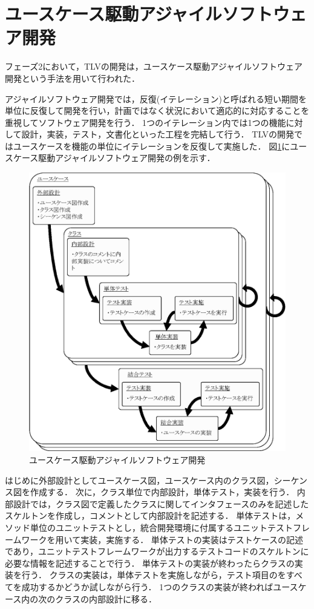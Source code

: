 \section{ユースケース駆動アジャイルソフトウェア開発}
\label{usecaseAgile}

フェーズ2において，TLVの開発は，ユースケース駆動アジャイルソフトウェア開発という手法を用いて行われた．

アジャイルソフトウェア開発では，反復(イテレーション)と呼ばれる短い期間を単位に反復して開発を行い，計画ではなく状況において適応的に対応することを重視してソフトウェア開発を行う．
1つのイテレーション内では1つの機能に対して設計，実装，テスト，文書化といった工程を完結して行う．
TLVの開発ではユースケースを機能の単位にイテレーションを反復して実施した．
図\ref{fig:agile}にユースケース駆動アジャイルソフトウェア開発の例を示す．

\begin{figure}[t]
\begin{center}
\includegraphics[scale=0.75]{img/agile.eps}
\caption{ユースケース駆動アジャイルソフトウェア開発}
\label{fig:agile}
\end{center}
\end{figure}

はじめに外部設計としてユースケース図，ユースケース内のクラス図，シーケンス図を作成する．
次に，クラス単位で内部設計，単体テスト，実装を行う．
内部設計では，クラス図で定義したクラスに関してインタフェースのみを記述したスケルトンを作成し，コメントとして内部設計を記述する．
単体テストは，メソッド単位のユニットテストとし，統合開発環境に付属するユニットテストフレームワークを用いて実装，実施する．
単体テストの実装はテストケースの記述であり，ユニットテストフレームワークが出力するテストコードのスケルトンに必要な情報を記述することで行う．
単体テストの実装が終わったらクラスの実装を行う．
クラスの実装は，単体テストを実施しながら，テスト項目のをすべてを成功するかどうか試しながら行う．
1つのクラスの実装が終わればユースケース内の次のクラスの内部設計に移る．

